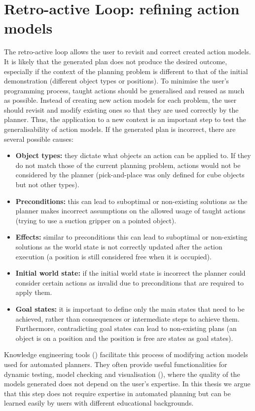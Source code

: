 \section{Retro-active Loop: refining action models}
The retro-active loop allows the user to revisit and correct created action models.
It is likely that the generated plan does not produce the desired outcome, especially if the context of the planning problem is different to that of the initial demonstration (\eg different object types or positions).
To minimise the user's programming process, taught actions should be generalised and reused as much as possible.
Instead of creating new action models for each problem, the user should revisit and modify existing ones so that they are used correctly by the planner.
Thus, the application to a new context is an important step to test the generalisability of action models.
If the generated plan is incorrect, there are several possible causes:
\begin{itemize}
	\item \textbf{Object types:} they dictate what objects an action can be applied to. If they do not match those of the current planning problem, actions would not be considered by the planner (\eg pick-and-place was only defined for cube objects but not other types).
	\item \textbf{Preconditions:} this can lead to suboptimal or non-existing solutions as the planner makes incorrect assumptions on the allowed usage of taught actions (\eg trying to use a suction gripper on a pointed object).
	\item \textbf{Effects:} similar to preconditions this can lead to suboptimal or non-existing solutions as the world state is not correctly updated after the action execution (\eg a position is still considered free when it is occupied).
	\item \textbf{Initial world state:} if the initial world state is incorrect the planner could consider certain actions as invalid due to preconditions that are required to apply them.
	\item \textbf{Goal states:} it is important to define only the main states that need to be achieved, rather than consequences or intermediate steps to achieve them. Furthermore, contradicting goal states can lead to non-existing plans (\eg an object is on a position and the position is free are states as goal states).
\end{itemize}

Knowledge engineering tools () facilitate this process of modifying action models used for automated planners.
They often provide useful functionalities for dynamic testing, model checking and visualisation (\cite{simpson2007planning}), where the quality of the models generated does not depend on the user's expertise.
In this thesis we argue that this step does not require expertise in automated planning but can be learned easily by users with different educational backgrounds.